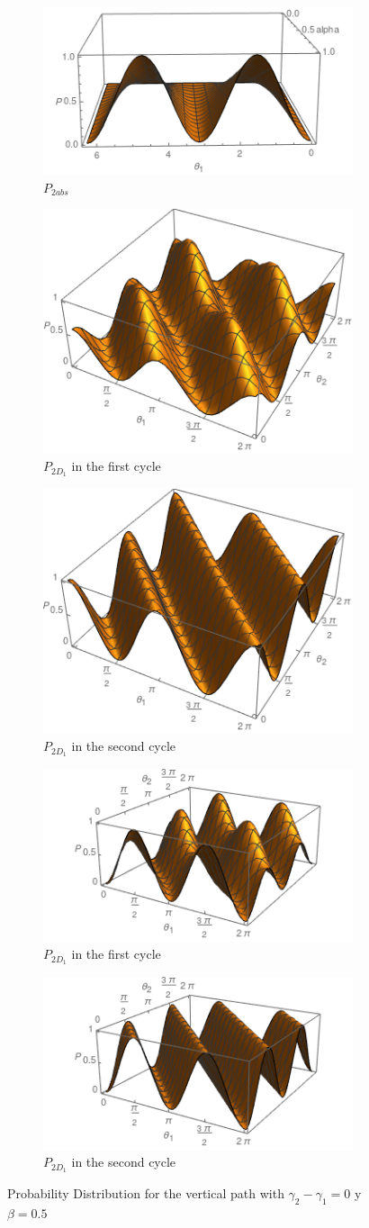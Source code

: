 \documentclass{book}
\begin{document}
\begin{figure}[!h]
\centering
\begin{subfigure}[b]{0.40\linewidth}
\includegraphics[width=\linewidth,height=3 cm]{images/pcabs.png}
\caption{$P_{2abs}$}
\label{fig:BS1}
\end{subfigure}
\begin{subfigure}[b]{0.40\linewidth}
\includegraphics[width=\linewidth,height=3 cm]{images/pcd21.png}
\caption{$P_{2D_{1}}$ in the first cycle }
\label{fig:BS1}
\end{subfigure}
\begin{subfigure}[b]{0.40\linewidth}
\includegraphics[width=\linewidth,height=3 cm]{images/pcd22.png}
\caption{$P_{2D_{1}}$ in the second cycle}
\label{fig:BS1}
\end{subfigure}
\begin{subfigure}[b]{0.40\linewidth}
\includegraphics[width=\linewidth,height=3 cm]{images/pcd11.png}
\caption{$P_{2D_{1}} $ in the first cycle}
\label{fig:westminster_aerea}
\end{subfigure}
\begin{subfigure}[b]{0.40\linewidth}
\includegraphics[width=\linewidth,height=3 cm]{images/pcd12.png}
\caption{$P_{2D_{1}} $ in the second cycle }
\label{fig:BS1}
\end{subfigure}
\caption{Probability Distribution for the vertical path with  $\gamma_{2}-\gamma_{1}=0 $ y $\beta=0.5$}
\label{P4chopper}
\end{figure}
\end{document}
